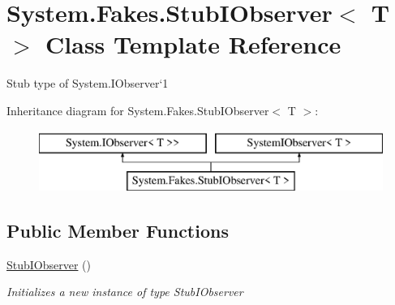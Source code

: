\hypertarget{class_system_1_1_fakes_1_1_stub_i_observer_3_01_t_01_4}{\section{System.\-Fakes.\-Stub\-I\-Observer$<$ T $>$ Class Template Reference}
\label{class_system_1_1_fakes_1_1_stub_i_observer_3_01_t_01_4}
}


Stub type of System.\-I\-Observer`1 


Inheritance diagram for System.\-Fakes.\-Stub\-I\-Observer$<$ T $>$\-:\begin{figure}[H]
\begin{center}
\leavevmode
\includegraphics[height=2.000000cm]{class_system_1_1_fakes_1_1_stub_i_observer_3_01_t_01_4}
\end{center}
\end{figure}
\subsection*{Public Member Functions}
\begin{DoxyCompactItemize}
\item 
\hyperlink{class_system_1_1_fakes_1_1_stub_i_observer_3_01_t_01_4_a03e03d19756250dc33a0ef2fca1111e9}{Stub\-I\-Observer} ()
\begin{DoxyCompactList}\small\item\em Initializes a new instance of type Stub\-I\-Observer\end{DoxyCompactList}\end{DoxyCompactItemize}
